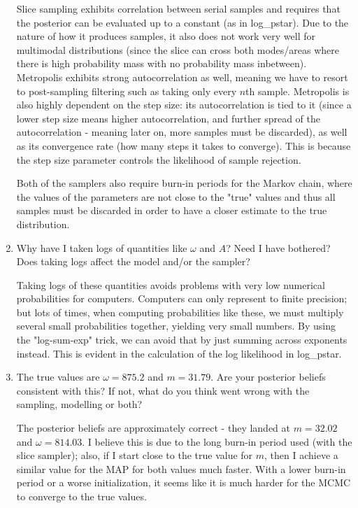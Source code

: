 \documentclass[11pt]{article}
\begin{document}
\begin{enumerate}
        Slice sampling exhibits correlation between serial samples and requires that the posterior can be evaluated up to a constant (as in log\_pstar). Due to the nature of how it produces samples, it also does not work very well for multimodal distributions (since the slice can cross both modes/areas where there is high probability mass with no probability mass inbetween). Metropolis exhibits strong autocorrelation as well, meaning we have to resort to post-sampling filtering such as taking only every $n$th sample. Metropolis is also highly dependent on the step size: its autocorrelation is tied to it (since a lower step size means higher autocorrelation, and further spread of the autocorrelation - meaning later on, more samples must be discarded), as well as its convergence rate (how many steps it takes to converge). This is because the step size parameter controls the likelihood of sample rejection.

        Both of the samplers also require burn-in periods for the Markov chain, where the values of the parameters are not close to the "true" values and thus all samples must be discarded in order to have a closer estimate to the true distribution.
    
    \item Why have I taken logs of quantities like $\omega$ and $A$? Need I have bothered? Does taking logs affect the model and/or the sampler?

        Taking logs of these quantities avoids problems with very low numerical probabilities for computers. Computers can only represent to finite precision; but lots of times, when computing probabilities like these, we must multiply several small probabilities together, yielding very small numbers. By using the "log-sum-exp" trick, we can avoid that by just summing across exponents instead. This is evident in the calculation of the log likelihood in log\_pstar.
    
    \item The true values are $\omega = 875.2$ and $m = 31.79$. Are your posterior beliefs consistent with this? If not, what do you think went wrong with the sampling, modelling or both?

        The posterior beliefs are approximately correct - they landed at $m = 32.02$ and $\omega = 814.03$. I believe this is due to the long burn-in period used (with the slice sampler); also, if I start close to the true value for $m$, then I achieve a similar value for the MAP for both values much faster. With a lower burn-in period or a worse initialization, it seems like it is much harder for the MCMC to converge to the true values.

\end{enumerate}
\end{document}
